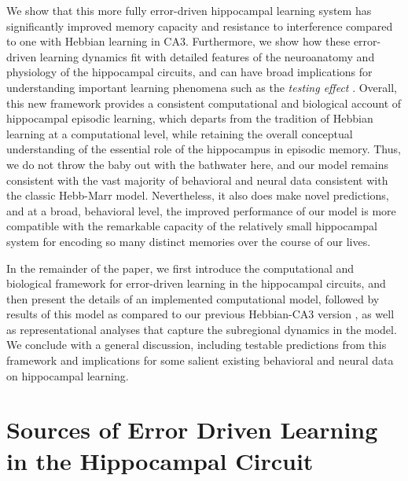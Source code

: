 \documentclass[11pt,twoside]{article}
\newif\myifpdf
\begin{document}
We show that this more fully error-driven hippocampal learning system has significantly improved memory capacity and resistance to interference compared to one with Hebbian learning in CA3.  Furthermore, we show how these error-driven learning dynamics fit with detailed features of the neuroanatomy and physiology of the hippocampal circuits, and can have broad implications for understanding important learning phenomena such as the \emph{testing effect} \citep{LiuOReillyRanganath21}.  Overall, this new framework provides a consistent computational and biological account of hippocampal episodic learning, which departs from the tradition of Hebbian learning at a computational level, while retaining the overall conceptual understanding of the essential role of the hippocampus in episodic memory.  Thus, we do not throw the baby out with the bathwater here, and our model remains consistent with the vast majority of behavioral and neural data consistent with the classic Hebb-Marr model.  Nevertheless, it also does make novel predictions, and at a broad, behavioral level, the improved performance of our model is more compatible with the remarkable capacity of the relatively small hippocampal system for encoding so many distinct memories over the course of our lives.

In the remainder of the paper, we first introduce the computational and biological framework for error-driven learning in the hippocampal circuits, and then present the details of an implemented computational model, followed by results of this model as compared to our previous Hebbian-CA3 version \citep{KetzMorkondaOReilly13}, as well as representational analyses that capture the subregional dynamics in the model.  We conclude with a general discussion, including testable predictions from this framework and implications for some salient existing behavioral and neural data on hippocampal learning.

\section{Sources of Error Driven Learning in the Hippocampal Circuit}
\end{document}
